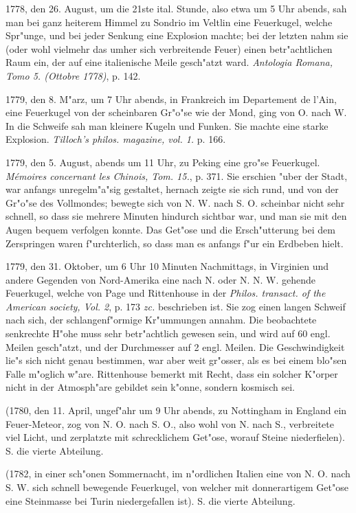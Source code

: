 \documentclass[a4paper, 11pt, oneside, polutonikogreek, german]{article}
\begin{document}
1778, den 26. August, um die 21ste ital. Stunde, also etwa um 5 Uhr abends, sah man bei ganz heiterem Himmel zu Sondrio im Veltlin eine Feuerkugel, welche Spr"unge, und bei jeder Senkung eine Explosion machte; bei der letzten nahm sie (oder wohl vielmehr das umher sich verbreitende Feuer) einen betr"achtlichen Raum ein, der auf eine italienische Meile gesch"atzt ward. \emph{Antologia Romana, Tomo 5. (Ottobre 1778)}, p. 142.

1779, den 8. M"arz, um 7 Uhr abends, in Frankreich im Departement de l'Ain, eine Feuerkugel von der scheinbaren Gr"o"se wie der Mond, ging von O. nach W. In die Schweife sah man kleinere Kugeln und Funken. Sie machte eine starke Explosion. \emph{Tilloch's philos. magazine, vol. 1.} p. 166.

1779, den 5. August, abends um 11 Uhr, zu Peking eine gro"se Feuerkugel. \emph{Mémoires concernant les Chinois, Tom. 15.}, p. 371. Sie erschien "uber der Stadt, war anfangs unregelm"a"sig gestaltet, hernach zeigte sie sich rund, und von der Gr"o"se des Vollmondes; bewegte sich von N. W. nach S. O. scheinbar nicht sehr schnell, so dass sie mehrere Minuten hindurch sichtbar war, und man sie mit den Augen bequem verfolgen konnte. Das Get"ose und die Ersch"utterung bei dem Zerspringen waren f"urchterlich, so dass man es anfangs f"ur ein Erdbeben hielt.

1779, den 31. Oktober, um 6 Uhr 10 Minuten Nachmittags, in Virginien und andere Gegenden von Nord-Amerika eine nach N. oder N. N. W. gehende Feuerkugel, welche von Page und Rittenhouse in der \emph{Philos. transact. of the American society, Vol. 2}, p. 173 \emph{zc.} beschrieben ist. Sie zog einen langen Schweif nach sich, der schlangenf"ormige Kr"ummungen annahm. Die beobachtete senkrechte H"ohe muss sehr betr"achtlich gewesen sein, und wird auf 60 engl. Meilen gesch"atzt, und der Durchmesser auf 2 engl. Meilen. Die Geschwindigkeit lie"s sich nicht genau bestimmen, war aber weit gr"osser, als es bei einem blo"sen Falle m"oglich w"are. Rittenhouse bemerkt mit Recht, dass ein solcher K"orper nicht in der Atmosph"are gebildet sein k"onne, sondern kosmisch sei.

(1780, den 11. April, ungef"ahr um 9 Uhr abends, zu Nottingham in England ein Feuer-Meteor, zog von N. O. nach S. O., also wohl von N. nach S., verbreitete viel Licht, und zerplatzte mit schrecklichem Get"ose, worauf Steine niederfielen). S. die vierte Abteilung.

(1782, in einer sch"onen Sommernacht, im n"ordlichen Italien eine von N. O. nach S. W. sich schnell bewegende Feuerkugel, von welcher mit donnerartigem Get"ose eine Steinmasse bei Turin niedergefallen ist). S. die vierte Abteilung.
\end{document}
